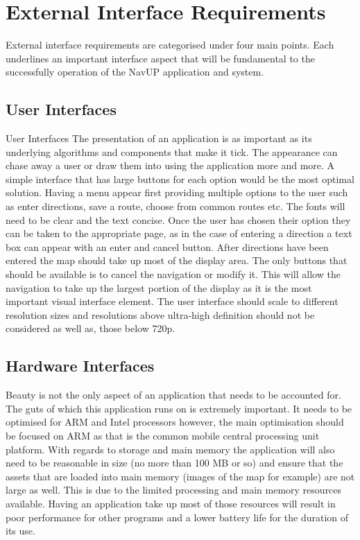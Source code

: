 \documentclass[11pt]{article}
\begin{document}
\section{External Interface Requirements}

External interface requirements are categorised under four main points. Each underlines an important interface aspect that will be fundamental to the successfully operation of the NavUP application and system. 

\subsection{User Interfaces}
User Interfaces
The presentation of an application is as important as its underlying algorithms and components that make it tick. The appearance can chase away a user or draw them into using the application more and more. A simple interface that has large buttons for each option would be the most optimal solution. Having a menu appear first providing multiple options to the user such as enter directions, save a route, choose from common routes etc. The fonts will need to be clear and the text concise. Once the user has chosen their option they can be taken to the appropriate page, as in the case of entering a direction a text box can appear with an enter and cancel button. After directions have been entered the map should take up most of the display area. The only buttons that should be available is to cancel the navigation or modify it. This will allow the navigation to take up the largest portion of the display as it is the most important visual interface element. 
The user interface should scale to different resolution sizes and resolutions above ultra-high definition should not be considered as well as, those below 720p. 

\subsection{Hardware Interfaces}
Beauty is not the only aspect of an application that needs to be accounted for. The guts of which this application runs on is extremely important. It needs to be optimised for ARM and Intel processors however, the main optimisation should be focused on ARM as that is the common mobile central processing unit platform. With regards to storage and main memory the application will also need to be reasonable in size (no more than 100 MB or so) and ensure that the assets that are loaded into main memory (images of the map for example) are not large as well. This is due to the limited processing and main memory resources available. Having an application take up most of those resources will result in poor performance for other programs and a lower battery life for the duration of its use. 
\end{document}
